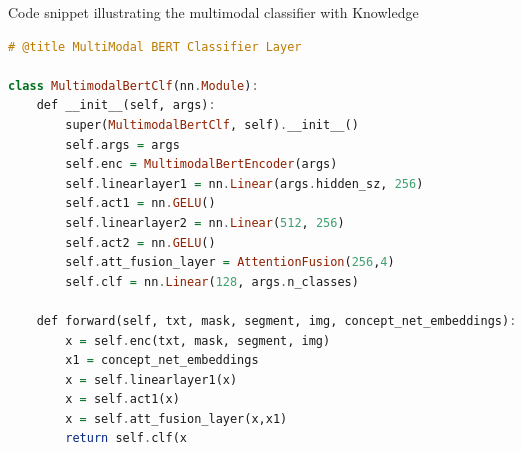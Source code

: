 \begin{listing}%
\caption{Code snippet illustrating the multimodal classifier with Knowledge}%
\label{lst:listing}%
\begin{lstlisting}[language=Haskell]
# @title MultiModal BERT Classifier Layer

class MultimodalBertClf(nn.Module):
    def __init__(self, args):
        super(MultimodalBertClf, self).__init__()
        self.args = args
        self.enc = MultimodalBertEncoder(args)
        self.linearlayer1 = nn.Linear(args.hidden_sz, 256)
        self.act1 = nn.GELU()
        self.linearlayer2 = nn.Linear(512, 256)
        self.act2 = nn.GELU()
        self.att_fusion_layer = AttentionFusion(256,4)
        self.clf = nn.Linear(128, args.n_classes)

    def forward(self, txt, mask, segment, img, concept_net_embeddings):
        x = self.enc(txt, mask, segment, img)
        x1 = concept_net_embeddings
        x = self.linearlayer1(x)
        x = self.act1(x)
        x = self.att_fusion_layer(x,x1)
        return self.clf(x

\end{lstlisting}
\end{listing}






